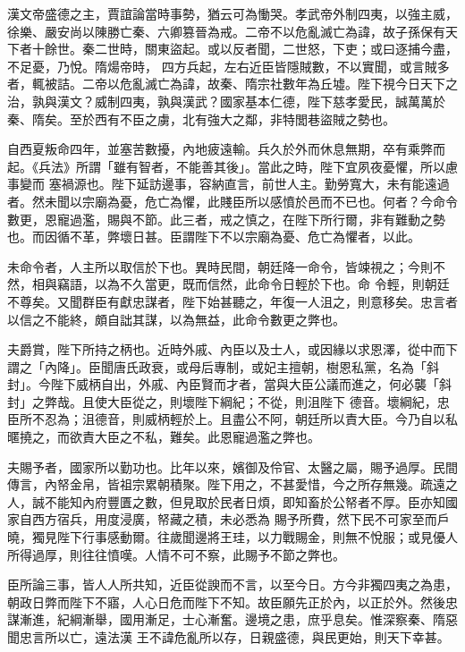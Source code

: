 \begin{pinyinscope}
 漢文帝盛德之主，賈誼論當時事勢，猶云可為慟哭。孝武帝外制四夷，以強主威，徐樂、嚴安尚以陳勝亡秦、六卿篡晉為戒。二帝不以危亂滅亡為諱，故子孫保有天下者十餘世。秦二世時，關東盜起。或以反者聞，二世怒，下吏；或曰逐捕今盡，不足憂，乃悅。隋煬帝時，
 四方兵起，左右近臣皆隱賊數，不以實聞，或言賊多者，輒被詰。二帝以危亂滅亡為諱，故秦、隋宗社數年為丘墟。陛下視今日天下之治，孰與漢文？威制四夷，孰與漢武？國家基本仁德，陛下慈孝愛民，誠萬萬於秦、隋矣。至於西有不臣之虜，北有強大之鄰，非特閭巷盜賊之勢也。



 自西夏叛命四年，並塞苦數擾，內地疲遠輸。兵久於外而休息無期，卒有乘弊而起。《兵法》所謂「雖有智者，不能善其後」。當此之時，陛下宜夙夜憂懼，所以慮事變而
 塞禍源也。陛下延訪邊事，容納直言，前世人主。勤勞寬大，未有能遠過者。然未聞以宗廟為憂，危亡為懼，此賤臣所以感憤於邑而不已也。何者？今命令數更，恩寵過濫，賜與不節。此三者，戒之慎之，在陛下所行爾，非有難動之勢也。而因循不革，弊壞日甚。臣謂陛下不以宗廟為憂、危亡為懼者，以此。



 未命令者，人主所以取信於下也。異時民間，朝廷降一命令，皆竦視之；今則不然，相與竊語，以為不久當更，既而信然，此命令日輕於下也。命
 令輕，則朝廷不尊矣。又聞群臣有獻忠謀者，陛下始甚聽之，年復一人沮之，則意移矣。忠言者以信之不能終，頗自詘其謀，以為無益，此命令數更之弊也。



 夫爵賞，陛下所持之柄也。近時外戚、內臣以及士人，或因緣以求恩澤，從中而下謂之「內降」。臣聞唐氏政衰，或母后專制，或妃主擅朝，樹恩私黨，名為「斜封」。今陛下威柄自出，外戚、內臣賢而才者，當與大臣公議而進之，何必襲「斜封」之弊哉。且使大臣從之，則壞陛下綱紀；不從，則沮陛下
 德音。壞綱紀，忠臣所不忍為；沮德音，則威柄輕於上。且盡公不阿，朝廷所以責大臣。今乃自以私暱撓之，而欲責大臣之不私，難矣。此恩寵過濫之弊也。



 夫賜予者，國家所以勤功也。比年以來，嬪御及伶官、太醫之屬，賜予過厚。民間傳言，內帑金帛，皆祖宗累朝積聚。陛下用之，不甚愛惜，今之所存無幾。疏遠之人，誠不能知內府豐匱之數，但見取於民者日煩，即知畜於公帑者不厚。臣亦知國家自西方宿兵，用度浸廣，帑藏之積，未必悉為
 賜予所費，然下民不可家至而戶曉，獨見陛下行事感動爾。往歲聞邊將王珪，以力戰賜金，則無不悅服；或見優人所得過厚，則往往憤嘆。人情不可不察，此賜予不節之弊也。



 臣所論三事，皆人人所共知，近臣從諛而不言，以至今日。方今非獨四夷之為患，朝政日弊而陛下不寤，人心日危而陛下不知。故臣願先正於內，以正於外。然後忠謀漸進，紀綱漸舉，國用漸足，士心漸奮。邊境之患，庶乎息矣。惟深察秦、隋惡聞忠言所以亡，遠法漢
 王不諱危亂所以存，日親盛德，與民更始，則天下幸甚。




\end{pinyinscope}
